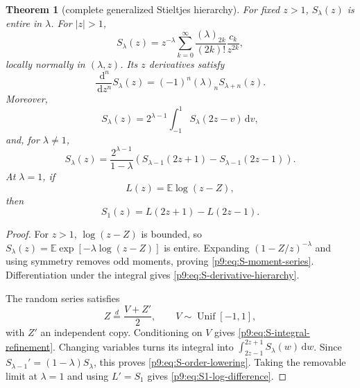 \documentclass[11pt,oneside]{article}
\newtheorem{theorem}{Theorem}[section]
\theoremstyle{definition}
\theoremstyle{remark}
\newcommand{\E}{\mathbb E}
\newcommand{\dd}{\,\mathrm d}
\newcommand{\1}{\mathbf 1}
\begin{document}
\begin{theorem}[complete generalized Stieltjes hierarchy]
\label{p9:thm:Stieltjes-hierarchy}
For fixed $z>1$, $S_\lambda(z)$ is entire in $\lambda$.  For $|z|>1$,
\begin{equation}
 S_\lambda(z)
 =z^{-\lambda}\sum_{k=0}^{\infty}
   \frac{(\lambda)_{2k}}{(2k)!}\frac{c_k}{z^{2k}},
 \label{p9:eq:S-moment-series}
\end{equation}
locally normally in $(\lambda,z)$.  Its $z$ derivatives satisfy
\begin{equation}
 \frac{\dd^n}{\dd z^n}S_\lambda(z)
 =(-1)^n(\lambda)_nS_{\lambda+n}(z).
 \label{p9:eq:S-derivative-hierarchy}
\end{equation}
Moreover,
\begin{equation}
 S_\lambda(z)
 =2^{\lambda-1}\int_{-1}^{1}S_\lambda(2z-v)\dd v,
 \label{p9:eq:S-integral-refinement}
\end{equation}
and, for $\lambda\ne1$,
\begin{equation}
 S_\lambda(z)
 =\frac{2^{\lambda-1}}{1-\lambda}
  \left(S_{\lambda-1}(2z+1)-S_{\lambda-1}(2z-1)\right).
 \label{p9:eq:S-order-lowering}
\end{equation}
At $\lambda=1$, if
\begin{equation}
 L(z)=\E\log(z-Z),
 \label{p9:eq:log-potential}
\end{equation}
then
\begin{equation}
 S_1(z)=L(2z+1)-L(2z-1).
 \label{p9:eq:S1-log-difference}
\end{equation}
\end{theorem}

\begin{proof}
For $z>1$, $\log(z-Z)$ is bounded, so
$S_\lambda(z)=\E\exp[-\lambda\log(z-Z)]$ is entire.  Expanding
$(1-Z/z)^{-\lambda}$ and using symmetry removes odd moments, proving
\cref{p9:eq:S-moment-series}.  Differentiation under the integral gives
\cref{p9:eq:S-derivative-hierarchy}.

The random series satisfies
\begin{equation}
 Z\overset d=\frac{V+Z'}2,
 \qquad V\sim\operatorname{Unif}[-1,1],
 \label{p9:eq:Z-smoothing}
\end{equation}
with $Z'$ an independent copy.  Conditioning on $V$ gives
\cref{p9:eq:S-integral-refinement}.  Changing variables turns its integral into
$\int_{2z-1}^{2z+1}S_\lambda(w)\dd w$.  Since
$S_{\lambda-1}'=(1-\lambda)S_\lambda$, this proves
\cref{p9:eq:S-order-lowering}.  Taking the removable limit at $\lambda=1$ and
using $L'=S_1$ gives \cref{p9:eq:S1-log-difference}.
\end{proof}
\end{document}
